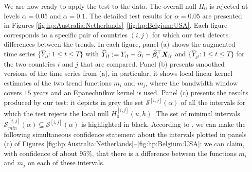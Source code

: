 \documentclass[12pt]{article}
\makeatletter
\renewcommand{\eqref}[1]{\tagform@{\ref{#1}}}
\makeatother
\begin{document}
We are now ready to apply the test to the data. The overall null $H_0$ is rejected at levels $\alpha = 0.05$ and $\alpha = 0.1$. The detailed test results for $\alpha =0.05$ are presented in Figures \ref{fig:hp:Australia:Netherlands}--\ref{fig:hp:Belgium:USA}. 
Each figure corresponds to a specific pair of countries $(i, j)$ for which our test detects differences between the trends. 
In each figure, panel (a) shows the augmented time series $\{\widehat{Y}_{it}: 1 \le t \le T\}$ with $\widehat{Y}_{it} := Y_{it} -\widehat{\alpha}_i - \widehat{\bm{\beta}}_i^\top \boldsymbol{X}_{it}$ and $\{\widehat{Y}_{jt}: 1 \le t \le T\}$ for the two countries $i$ and $j$ that are compared. 
Panel (b) presents smoothed versions of the time series from (a), in particular, it shows local linear kernel estimates of the two trend functions $m_i$ and $m_j$, where the bandwidth window covers $15$ years and an Epanechnikov kernel is used.
Panel (c) presents the results produced by our test: 
it depicts in grey the set $\mathcal{S}^{[i, j]}(\alpha)$ of all the intervals for which the test rejects the local null $H_0^{[i, j]}(u, h)$. The set of minimal intervals $\mathcal{S}^{[i, j]}_{min}(\alpha) \subseteq \mathcal{S}^{[i, j]}(\alpha)$ is highlighted in black. According to \eqref{eq:CS-v2}, we can make the following simultaneous confidence statement about the intervals plotted in panels (c) of Figures \ref{fig:hp:Australia:Netherlands}--\ref{fig:hp:Belgium:USA}: we can claim, with confidence of about $95\%$, that there is a difference between the functions $m_i$ and $m_j$ on each of these intervals. 


\end{document}
